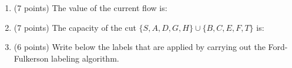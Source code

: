 \documentclass[12pt]{article}
\begin{document}
\begin{enumerate}

    \begin{enumerate}[label=({\alph*})]
      \item (7 points) The value of the current flow is:
      \item (7 points) The capacity of the cut \(\{S, A, D, G, H\} \cup \{B, C, E, F, T\}\) is:
      \item (6 points) Write below the labels that are applied by carrying out the Ford-Fulkerson labeling algorithm.
    \end{enumerate}


\end{enumerate}
\end{document}
